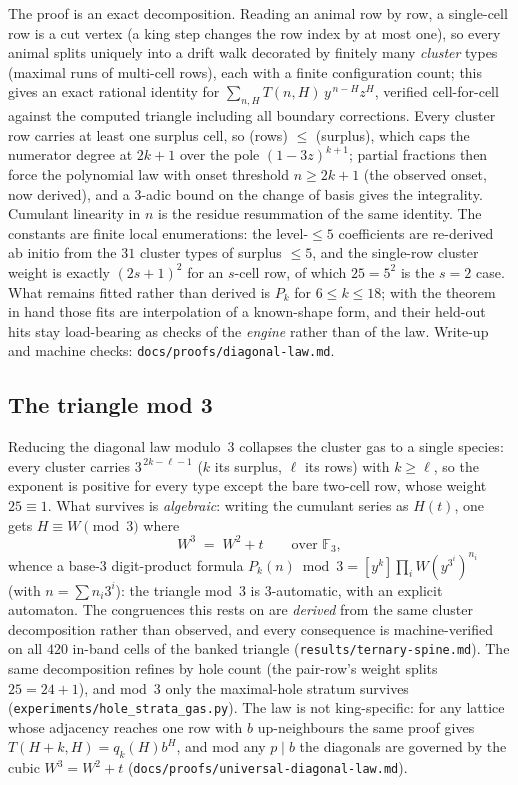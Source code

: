 \documentclass[11pt]{article}
\begin{document}
The proof is an exact decomposition. Reading an animal row by row, a
single-cell row is a cut vertex (a king step changes the row index by at
most one), so every animal splits uniquely into a drift walk decorated by
finitely many \emph{cluster} types (maximal runs of multi-cell rows), each
with a finite configuration count; this gives an exact rational identity
for $\sum_{n,H}T(n,H)\,y^{\,n-H}z^H$, verified cell-for-cell against the
computed triangle including all boundary corrections. Every cluster row
carries at least one surplus cell, so (rows) $\le$ (surplus), which caps the
numerator degree at $2k+1$ over the pole $(1-3z)^{k+1}$; partial fractions
then force the polynomial law with onset threshold $n\ge2k+1$ (the observed
onset, now derived), and a $3$-adic bound on the change of basis gives the
integrality. Cumulant linearity in $n$ is the residue resummation of the
same identity. The constants are finite local enumerations: the
level-$\le5$ coefficients are re-derived ab initio from the $31$ cluster
types of surplus $\le5$, and the single-row cluster weight is exactly
$(2s{+}1)^2$ for an $s$-cell row, of which $25=5^2$ is the $s=2$ case. What
remains fitted rather than derived is $P_k$ for $6\le k\le18$; with the
theorem in hand those fits are interpolation of a known-shape form, and
their held-out hits stay load-bearing as checks of the \emph{engine} rather
than of the law. Write-up and machine checks:
\texttt{docs/proofs/diagonal-law.md}.

\subsection{The triangle mod 3}
\label{sec:spine}

Reducing the diagonal law modulo~3 collapses the cluster gas to a single
species: every cluster carries $3^{\,2k-\ell-1}$ ($k$ its surplus, $\ell$
its rows) with $k\ge\ell$, so the exponent is positive for every type
except the bare two-cell row, whose weight $25\equiv1$. What survives is
\emph{algebraic}: writing the cumulant series as $H(t)$, one gets
$H\equiv W\pmod 3$ where
\[
  W^3 \;=\; W^2 + t \qquad\text{over } \mathbb F_3 ,
\]
whence a base-3 digit-product formula
$P_k(n)\bmod 3 = [y^k]\prod_i W(y^{3^i})^{n_i}$ (with $n=\sum n_i3^i$): the
triangle mod~3 is $3$-automatic, with an explicit automaton. The
congruences this rests on are \emph{derived} from the same cluster
decomposition rather than observed, and every consequence is
machine-verified on all $420$ in-band cells of the banked triangle
(\texttt{results/ternary-spine.md}). The same decomposition refines by hole
count (the pair-row's weight splits $25=24+1$), and mod~3 only the
maximal-hole stratum survives
(\texttt{experiments/hole\_strata\_gas.py}). The law is not king-specific: for any
lattice whose adjacency reaches one row with $b$ up-neighbours the same
proof gives $T(H{+}k,H)=q_k(H)b^H$, and mod any $p\mid b$ the diagonals are
governed by the cubic $W^3=W^2+t$
(\texttt{docs/proofs/universal-diagonal-law.md}).
\end{document}
